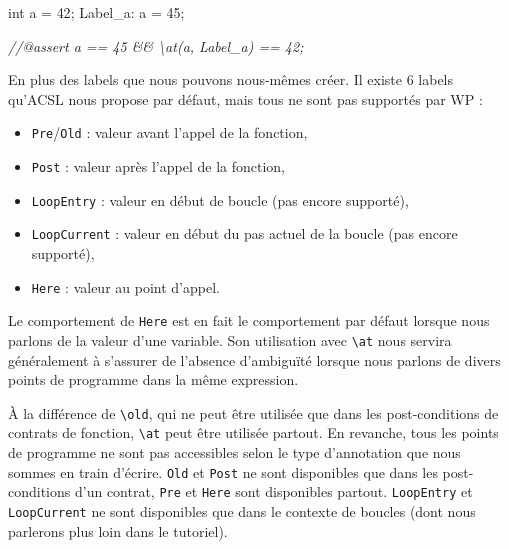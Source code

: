\documentclass[12pt,francais,]{scrbook}
\newenvironment{Shaded}{}{}
\newcommand{\DataTypeTok}[1]{\textcolor[rgb]{0.56,0.13,0.00}{{#1}}}
\newcommand{\DecValTok}[1]{\textcolor[rgb]{0.25,0.63,0.44}{{#1}}}
\newcommand{\CommentTok}[1]{\textcolor[rgb]{0.38,0.63,0.69}{\textit{{#1}}}}
\newcommand{\NormalTok}[1]{{#1}}
\providecommand{\tightlist}{%
  \setlength{\itemsep}{0pt}\setlength{\parskip}{0pt}}
\newenvironment{zdsblock}[1]{%
  \tcolorbox[beamer,%
    noparskip,breakable,
    colback=LightBlue,colframe=DarkBlue,%
    colbacklower=DarkBlue,%
    title=#1]
}{\endtcolorbox}
\begin{document}
\begin{footnotesize}\begin{Shaded}
\begin{Highlighting}[]
  \DataTypeTok{int} \NormalTok{a = }\DecValTok{42}\NormalTok{;}
 \NormalTok{Label_a:}
  \NormalTok{a = }\DecValTok{45}\NormalTok{;}

  \CommentTok{//@assert a == 45 && \textbackslash{}at(a, Label_a) == 42;}
\end{Highlighting}
\end{Shaded}\end{footnotesize}

En plus des labels que nous pouvons nous-mêmes créer. Il existe 6 labels
qu'ACSL nous propose par défaut, mais tous ne sont pas supportés par WP
:

\begin{itemize}
\tightlist
\item
  \texttt{Pre}/\texttt{Old} : valeur avant l'appel de la fonction,
\item
  \texttt{Post} : valeur après l'appel de la fonction,
\item
  \texttt{LoopEntry} : valeur en début de boucle (pas encore supporté),
\item
  \texttt{LoopCurrent} : valeur en début du pas actuel de la boucle (pas
  encore supporté),
\item
  \texttt{Here} : valeur au point d'appel.
\end{itemize}

\begin{zdsblock}{Information}
  Le comportement de \texttt{Here} est
  en fait le comportement par défaut lorsque nous parlons de la
  valeur d'une variable. Son utilisation avec \texttt{\textbackslash{}at}
  nous servira généralement à s'assurer de l'absence
  d'ambiguïté lorsque nous parlons de divers points de
  programme dans la même expression.
\end{zdsblock}

À la différence de \texttt{\textbackslash{}old}, qui ne peut être
utilisée que dans les post-conditions de contrats de fonction,
\texttt{\textbackslash{}at} peut être utilisée partout. En revanche,
tous les points de programme ne sont pas accessibles selon le type
d'annotation que nous sommes en train d'écrire. \texttt{Old} et
\texttt{Post} ne sont disponibles que dans les post-conditions d'un
contrat, \texttt{Pre} et \texttt{Here} sont disponibles partout.
\texttt{LoopEntry} et \texttt{LoopCurrent} ne sont disponibles que dans
le contexte de boucles (dont nous parlerons plus loin dans le tutoriel).
\end{document}
